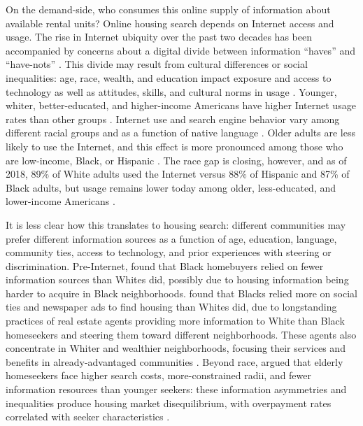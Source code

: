 \documentclass[11pt,letterpaper]{article}
\begin{document}
On the demand-side, who consumes this online supply of information about available rental units? Online housing search depends on Internet access and usage. The rise in Internet ubiquity over the past two decades has been accompanied by concerns about a digital divide between information \enquote{haves} and \enquote{have-nots} \citep{hersberger_are_2003,riddlesden_broadband_2014}. This divide may result from cultural differences or social inequalities: age, race, wealth, and education impact exposure and access to technology as well as attitudes, skills, and cultural norms in usage \citep{jones_u.s._2009,robinson_digital_2015}. Younger, whiter, better-educated, and higher-income Americans have higher Internet usage rates than other groups \citep{porter_using_2006}. Internet use and search engine behavior vary among different racial groups and as a function of native language \citep{slate_digital_2002,weber_who_2011}. Older adults are less likely to use the Internet, and this effect is more pronounced among those who are low-income, Black, or Hispanic \citep{choi_digital_2013}. The race gap is closing, however, and as of 2018, 89\% of White adults used the Internet versus 88\% of Hispanic and 87\% of Black adults, but usage remains lower today among older, less-educated, and lower-income Americans \citep{pew_research_center_internet_2018,pew_research_center_10_2019}.

It is less clear how this translates to housing search: different communities may prefer different information sources as a function of age, education, language, community ties, access to technology, and prior experiences with steering or discrimination. Pre-Internet, \citet{newburger_sources_1995} found that Black homebuyers relied on fewer information sources than Whites did, possibly due to housing information being harder to acquire in Black neighborhoods. \citet{farley_racial_1996} found that Blacks relied more on social ties and newspaper ads to find housing than Whites did, due to longstanding practices of real estate agents providing more information to White than Black homeseekers and steering them toward different neighborhoods. These agents also concentrate in Whiter and wealthier neighborhoods, focusing their services and benefits in already-advantaged communities \citep{besbris_investigating_2017}. Beyond race, \citet{deboer_resident_1985} argued that elderly homeseekers face higher search costs, more-constrained radii, and fewer information resources than younger seekers: these information asymmetries and inequalities produce housing market disequilibrium, with overpayment rates correlated with seeker characteristics \cite[cf.][]{desmond_are_2016,desmond_poor_2019}.
\end{document}
